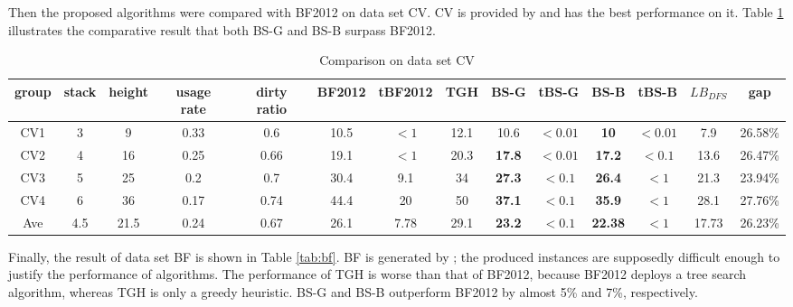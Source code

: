\documentclass[review,3p,times,authoryear,12pt]{elsarticle}
\begin{document}
Then the proposed algorithms were compared with BF2012 on data set CV. 
CV is provided by \cite{Caserta2009} and \cite{BF2012} has the best performance on it. 
Table \ref{tab:cv} illustrates the comparative result that both BS-G and BS-B surpass BF2012.

\begin{table}[!htb]
\scriptsize
  \centering
  \caption{\label{tab:cv} Comparison on data set CV}
    \begin{tabular}{c|c|c|c|c|c|c|c|c|c|c|c|c|c}
    \hline
    group & stack & height & usage rate & dirty ratio & BF2012 & tBF2012 & TGH   & BS-G  & tBS-G & BS-B  & tBS-B & $\mathit{LB}_\mathit{DFS}$ & gap\\
    \hline
    CV1  & 3  & 9   & 0.33 & 0.6  & 10.5 & $<1$ & 12.1 & 10.6          & $<0.01$ & \textbf{10}   & $<0.01$ &7.9 & 26.58\%\\
    CV2  & 4  & 16  & 0.25 & 0.66 & 19.1 & $<1$ & 20.3 & \textbf{17.8} & $<0.01$ & \textbf{17.2} & $<0.1$ &13.6 & 26.47\%\\
    CV3  & 5  & 25  & 0.2  & 0.7  & 30.4 & 9.1  & 34   & \textbf{27.3} & $<0.1$  & \textbf{26.4} & $<1$   &21.3 & 23.94\%\\
    CV4  & 6  & 36  & 0.17 & 0.74 & 44.4 & 20   & 50   & \textbf{37.1} & $<0.1$  & \textbf{35.9} & $<1$   &28.1 & 27.76\%\\
    \hline
    Ave  & 4.5& 21.5& 0.24 & 0.67 & 26.1 & 7.78 & 29.1 & \textbf{23.2} & $<0.1$  & \textbf{22.38}& $<1$   & 17.73 & 26.23\%\\
    \hline
    \end{tabular}%
\end{table}%

Finally, the result of data set BF is shown in Table \ref{tab:bf}. BF is generated by \cite{BF2012}; the produced instances are supposedly difficult enough to justify the performance of algorithms. The performance of TGH is worse than that of BF2012, because BF2012 deploys a tree search algorithm, whereas TGH is only a greedy heuristic. BS-G and BS-B outperform BF2012 by almost 5\% and 7\%, respectively. 
\end{document}
